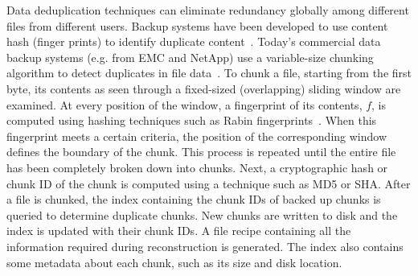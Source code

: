 Data deduplication techniques can eliminate redundancy globally among different files from different users. 
Backup systems have been developed to use content hash (finger prints) to identify duplicate 
content~\cite{venti02,Rhea2008}.
Today's commercial data backup systems (e.g. from EMC and NetApp)
use a variable-size chunking algorithm to detect duplicates in file data~\cite{similar94,hydrastor09}.
To chunk a file, starting from the first byte, its contents as seen through a fixed-sized (overlapping) 
sliding window are examined. At every position of the window, a fingerprint of its 
contents, $f$, is computed using hashing techniques such as Rabin fingerprints~\cite{rabin81}. 
When this fingerprint meets a certain criteria,
the position of the corresponding window defines the boundary of the chunk. 
This process is repeated until the entire file has been completely broken down into chunks. Next, 
a cryptographic hash or chunk ID of the chunk is computed using a technique such as MD5 or SHA.
After a file is chunked, the index containing the chunk IDs of backed up chunks 
is queried to determine duplicate chunks. New chunks are written to disk and the 
index is updated with their chunk IDs. A file recipe containing all the information 
required during reconstruction is generated. The index also contains some metadata 
about each chunk, such as its size and disk location.

